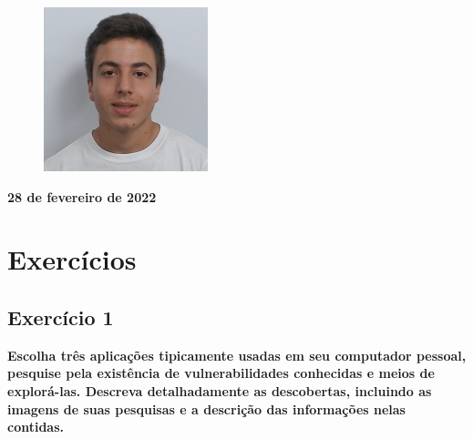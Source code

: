 \documentclass[11t]{article}
\begin{document}
\begin{titlepage}
\begin{center}
\begin{figure}[!htb]
            \centering
            \captionsetup{PG47225}
        \endminipage
        \hspace{0,2cm}
            \includegraphics[width=\linewidth]{images/80.jpg}
            \centering
            \captionsetup{A89597}
        \endminipage
        \hspace{0,2cm}
    \end{figure}
        
        \textbf{28 de fevereiro de 2022}
   \end{center}
    

\end{titlepage}

\tableofcontents
\thispagestyle{empty}
\clearpage
\listoffigures
\thispagestyle{empty}
\cleardoublepage

\setcounter{page}{1}

\clearpage
\section{Exercícios}

\vspace{0.5cm}

\subsection{Exercício 1}
\textbf{Escolha três aplicações tipicamente usadas em seu computador pessoal, pesquise pela existência de vulnerabilidades conhecidas e meios de explorá-las. Descreva detalhadamente as descobertas, incluindo as imagens de suas pesquisas e a descrição das informações nelas contidas.}
\end{document}
